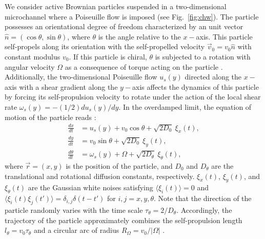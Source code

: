 \documentclass[aps,pre,preprint,superscriptaddress,amsmath,amssymb,nofootinbib]{revtex4}
\begin{document}
We consider active Brownian particles suspended in a two-dimensional microchannel where a Poiseuille flow is imposed (see Fig.~\ref{fig:chw}). 
The particle possesses an orientational degree of freedom characterized by an unit vector $\hat{n} = (\cos \theta, \sin \theta)$, where $\theta$ is the angle relative to the $x-$axis.
This particle self-propels along its orientation with the self-propelled velocity $\vec{v}_0 = v_0 \hat{n}$ with constant modulus $v_0$. 
If this particle is chiral, $\theta$ is subjected to a rotation with angular velocity $\Omega$ as a consequence of torque acting on the particle \cite{Lowen_RMP,Volpe_AJP}.
Additionally, the two-dimensional Poiseuille flow $u_s (y)$ directed along the $x-$axis with a shear gradient along the $y-$axis affects the dynamics of this particle by forcing its self-propulsion velocity to rotate under the action of the local shear rate $\omega_s (y) = -(1/2) du_s (y)/ dy$.
In the overdamped limit, the equation of motion of the particle reads \cite{Hagen_PRE}: 
\begin{subequations}
\begin{align}
\frac{dx}{dt} &= u_s (y) + v_0 \cos \theta + \sqrt{2 D_0}~ \xi_x (t), \\
\frac{dy}{dt} &= v_0 \sin \theta + \sqrt{2 D_0}~ \xi_y (t), \\
\frac{d \theta}{dt} &= \omega_s (y) + \Omega +  \sqrt{2 D_\theta} ~\xi_\theta (t),
\end{align}
\label{eq:Langevin} 
\end{subequations}
where $\vec{r} = (x, y)$ is the position of the particle, and $D_0$ and $D_\theta$ are the translational and rotational diffusion constants, respectively.
 $\xi_x (t)$, $\xi_y (t)$, and $\xi_\theta (t)$ are the Gaussian white noises satisfying $\langle \xi_i (t) \rangle = 0$ and $\langle \xi_i (t) \xi_j (t') \rangle = \delta_{i,j} \delta(t - t')$ for $i, j = x, y, \theta$.
 Note that the direction of the particle randomly varies with the time scale $\tau_\theta = 2/D_\theta$. 
 Accordingly, the trajectory of the particle approximately combines the self-propulsion length $l_\theta = v_0 \tau_\theta$ and a circular arc of radius $R_\Omega = v_0/|\Omega|$ \cite{Lowen_RMP, Teeffelen_PRE}.
 
\end{document}
